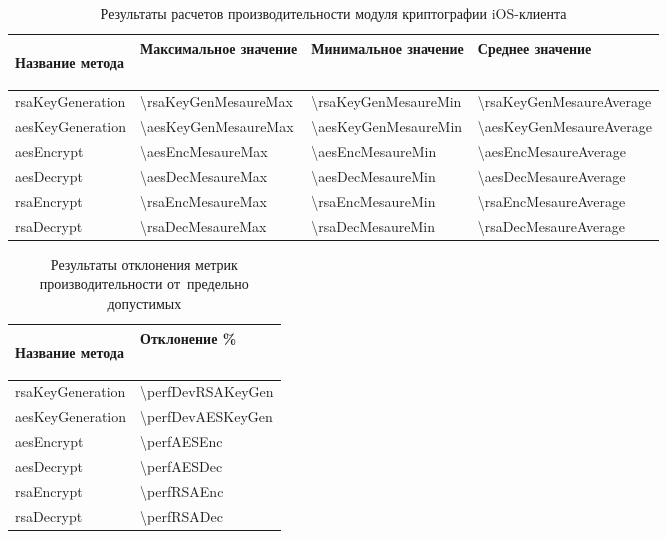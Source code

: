 \begin{table}[!ht]
  \caption{Результаты расчетов производительности модуля криптографии iOS-клиента}
  \label{sec:eng:performance:aesenc:result}
  \centering
  \begin{tabularx}{\linewidth}{
    |>{\hsize=1.6\hsize}X|
    >{\centering\arraybackslash\hsize=0.8\hsize}X|
    >{\centering\arraybackslash\hsize=0.8\hsize}X|
    >{\centering\arraybackslash\hsize=0.8\hsize}X|
  }
	\hline
 \begin{center}Название метода\end{center} & Максимальное значение &  Минимальное значение &  Среднее значение \\
 \hline
 rsaKeyGeneration & \num{\rsaKeyGenMesaureMax} & \num{\rsaKeyGenMesaureMin} & \num{\rsaKeyGenMesaureAverage} \\
 \hline
 aesKeyGeneration & \num{\aesKeyGenMesaureMax} & \num{\aesKeyGenMesaureMin} & \num{\aesKeyGenMesaureAverage} \\
 \hline
 aesEncrypt & \num{\aesEncMesaureMax} & \num{\aesEncMesaureMin} & \num{\aesEncMesaureAverage} \\
 \hline
 aesDecrypt & \num{\aesDecMesaureMax} & \num{\aesDecMesaureMin} & \num{\aesDecMesaureAverage} \\
 \hline
 rsaEncrypt & \num{\rsaEncMesaureMax} & \num{\rsaEncMesaureMin} & \num{\rsaEncMesaureAverage} \\
 \hline
 rsaDecrypt & \num{\rsaDecMesaureMax} & \num{\rsaDecMesaureMin} & \num{\rsaDecMesaureAverage} \\
 \hline
  \end{tabularx}
\end{table}

\begin{table}[!ht]
  \caption{Результаты отклонения метрик производительности от~предельно допустимых}
  \label{sec:eng:performance:aesenc:resultDev}
  \centering
  \begin{tabularx}{\linewidth}{
    |>{\hsize=1.4\hsize}X|
    >{\centering\arraybackslash\hsize=0.6\hsize}X|
  }
  \hline
 \begin{center}Название метода\end{center} & Отклонение \% \\
 \hline
 rsaKeyGeneration & \num{\perfDevRSAKeyGen} \\
 \hline
 aesKeyGeneration & \num{\perfDevAESKeyGen} \\
 \hline
 aesEncrypt & \num{\perfAESEnc} \\
 \hline
 aesDecrypt & \num{\perfAESDec} \\
 \hline
 rsaEncrypt & \num{\perfRSAEnc} \\
 \hline
 rsaDecrypt & \num{\perfRSADec} \\
 \hline
  \end{tabularx}
\end{table}

